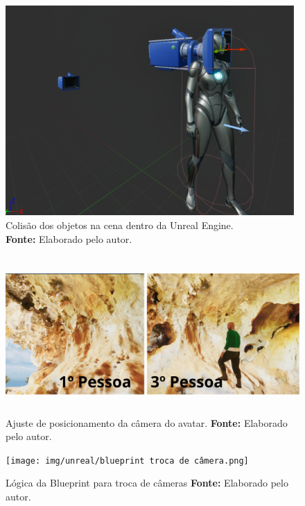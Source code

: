 \begin{figure}[H]
        \centering
        \includegraphics[height=8cm, keepaspectratio]{img/unreal/ajuste de câmera 1ºpessoa.png}
        \caption{Colisão dos objetos na cena dentro da Unreal Engine. \\
            \textbf{Fonte:} Elaborado pelo autor.}
        \label{fig:config_camera}
\end{figure}

\begin{figure}[H]
        \centering
        \includegraphics[height=6cm, keepaspectratio]{img/unreal/1 pessoa e 3 pessoa comparacao.png}
        \caption{Ajuste de posicionamento da câmera do avatar.
            \textbf{Fonte:} Elaborado pelo autor.}
        \label{fig:alternarcamera}
\end{figure}

\begin{figure}[H]
        \centering
        \texttt{[image: img/unreal/blueprint troca de câmera.png]}
        \caption{Lógica da Blueprint para troca de câmeras
            \textbf{Fonte:} Elaborado pelo autor.}
        \label{fig:blueprint_camera}
\end{figure}

